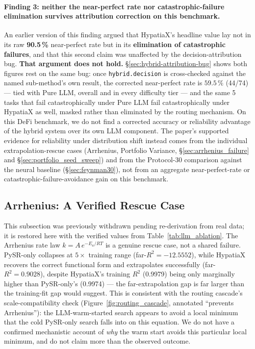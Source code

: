 \documentclass[twoside,11pt]{article}
\newcommand{\Rsq}{R^{2}}
\begin{document}
\paragraph{Finding 3: neither the near-perfect rate nor catastrophic-failure
elimination survives attribution correction on this benchmark.} An earlier
version of this finding argued that HypatiaX's headline value lay not in its
raw \textbf{90.5\,\%} near-perfect rate but in its \textbf{elimination of
catastrophic failures}, and that this second claim was unaffected by the
decision-attribution bug. \textbf{That argument does not hold.}
\S\ref{sec:hybrid-attribution-bug} shows both figures rest on the same bug:
once \texttt{hybrid.decision} is cross-checked against the named sub-method's
own result, the corrected near-perfect rate is $59.5\,\%$ (44/74) --- tied
with Pure LLM, overall and in every difficulty tier --- and the same 5 tasks
that fail catastrophically under Pure LLM fail catastrophically under
HypatiaX as well, masked rather than eliminated by the routing mechanism. On
this DeFi benchmark, we do not find a corrected accuracy or reliability
advantage of the hybrid system over its own LLM component. The paper's
supported evidence for reliability under distribution shift instead comes
from the individual extrapolation-rescue cases (Arrhenius, Portfolio
Variance, \S\ref{sec:arrhenius_failure} and \S\ref{sec:portfolio_seed_sweep})
and from the Protocol-30 comparison against the neural baseline
(\S\ref{sec:feynman30}), not from an aggregate near-perfect-rate or
catastrophic-failure-avoidance gain on this benchmark.

\subsection{Arrhenius: A Verified Rescue Case}\label{subsec:arrhenius-and-scaleincompatibility-failu}
\label{sec:arrhenius_failure}

This subsection was previously withdrawn pending re-derivation from real
data; it is restored here with the verified values from
Table~\ref{tab:llm_ablation}. The Arrhenius rate law $k = A\,e^{-E_a / RT}$
is a genuine rescue case, not a shared failure. PySR-only collapses at
$5\times$ training range (far-$\Rsq = -12.5552$), while HypatiaX recovers
the correct functional form and extrapolates successfully (far-$\Rsq =
0.9028$), despite HypatiaX's training $\Rsq$ (0.9979) being only marginally
higher than PySR-only's (0.9974) --- the far-extrapolation gap is far larger
than the training-fit gap would suggest. This is consistent with the
routing cascade's scale-compatibility check (Figure~\ref{fig:routing_cascade},
annotated ``prevents Arrhenius''): the LLM-warm-started search appears to
avoid a local minimum that the cold PySR-only search falls into on this
equation. We do not have a confirmed mechanistic account of \emph{why} the
warm start avoids this particular local minimum, and do not claim more than
the observed outcome.
\end{document}
